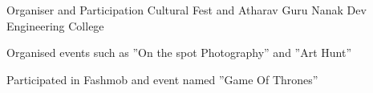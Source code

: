 


\begin{cventries}


\cventry
{Organiser and Participation} %
{Cultural Fest and Atharav } %
{Guru Nanak Dev Engineering College} %
{} %
{ %
\begin{cvitems}
\item {Organised events such as ”On the spot Photography” and ”Art Hunt”}
\item {Participated in Fashmob and event named ”Game Of Thrones”}
\end{cvitems}
}









\end{cventries}